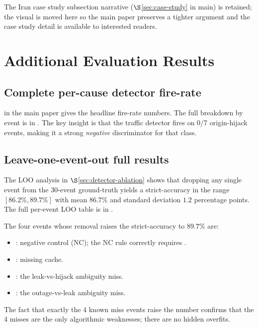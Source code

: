 \documentclass[sigcomm,nonatbib]{acmart}
\begin{document}
The Iran case study subsection narrative
($\S$\ref{sec:case-study} in main) is retained; the visual is
moved here so the main paper preserves a tighter argument and
the case study detail is available to interested readers.


\section{Additional Evaluation Results}
\label{supp:eval-the released fix}

\subsection{Complete per-cause detector fire-rate}
\label{supp:detector-fire}

 in the main paper gives the headline
fire-rate numbers. The full breakdown by event is in
. The key insight
is that the traffic detector fires on 0/7 origin-hijack events,
making it a strong \emph{negative} discriminator for that class.

\subsection{Leave-one-event-out full results}
\label{supp:loo-full}

The LOO analysis in $\S$\ref{sec:detector-ablation} shows that
dropping any single event from the 30-event ground-truth
yields a strict-accuracy in the range $[86.2\%, 89.7\%]$ with
mean $86.7\%$ and standard deviation $1.2$ percentage points.
The full per-event LOO table is in
.

The four events whose removal raises the strict-accuracy to
$89.7\%$ are:
\begin{itemize}
 \item : negative control (NC); the NC
 rule correctly requires .
 \item : missing cache.
 \item : the leak-vs-hijack
 ambiguity miss.
 \item : the outage-vs-leak
 ambiguity miss.
\end{itemize}
The fact that exactly the 4 known miss events raise the number
confirms that the 4 misses are the only algorithmic weaknesses;
there are no hidden overfits.
\end{document}
